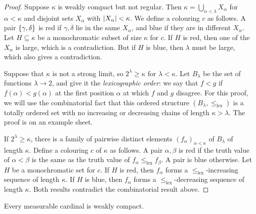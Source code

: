 \begin{proof}
    Suppose \( \kappa \) is weakly compact but not regular.
    Then \( \kappa = \bigcup_{\alpha < \lambda} X_\alpha \) for \( \alpha < \kappa \) and disjoint sets \( X_\alpha \) with \( \abs{X_\alpha} < \kappa \).
    We define a colouring \( c \) as follows.
    A pair \( \qty{\gamma,\delta} \) is red if \( \gamma, \delta \) lie in the same \( X_\alpha \), and blue if they are in different \( X_\alpha \).
    Let \( H \subseteq \kappa \) be a monochromatic subset of size \( \kappa \) for \( c \).
    If \( H \) is red, then one of the \( X_\alpha \) is large, which is a contradiction.
    But if \( H \) is blue, then \( \lambda \) must be large, which also gives a contradiction.

    Suppose that \( \kappa \) is not a strong limit, so \( 2^\lambda \geq \kappa \) for \( \lambda < \kappa \).
    Let \( B_\lambda \) be the set of functions \( \lambda \to 2 \), and give it the \emph{lexicographic order}: we say that \( f < g \) if \( f(\alpha) < g(\alpha) \) at the first position \( \alpha \) at which \( f \) and \( g \) disagree.
    For this proof, we will use the combinatorial fact that this ordered structure \( (B_\lambda, \leq_{\mathrm{lex}}) \) is a totally ordered set with no increasing or decreasing chains of length \( \kappa > \lambda \).
    The proof is on an example sheet.

    If \( 2^\lambda \geq \kappa \), there is a family of pairwise distinct elements \( (f_\alpha)_{\alpha < \kappa} \) of \( B_\lambda \) of length \( \kappa \).
    Define a colouring \( c \) of \( \kappa \) as follows.
    A pair \( \alpha, \beta \) is red if the truth value of \( \alpha < \beta \) is the same as the truth value of \( f_\alpha \leq_{\mathrm{lex}} f_\beta \).
    A pair is blue otherwise.
    Let \( H \) be a monochromatic set for \( c \).
    If \( H \) is red, then \( f_\alpha \) forms a \( \leq_{\mathrm{lex}} \)-increasing sequence of length \( \kappa \).
    If \( H \) is blue, then \( f_\alpha \) forms a \( \leq_{\mathrm{lex}} \)-decreasing sequence of length \( \kappa \).
    Both results contradict the combinatorial result above.
\end{proof}
\begin{theorem}
    Every measurable cardinal is weakly compact.
\end{theorem}
